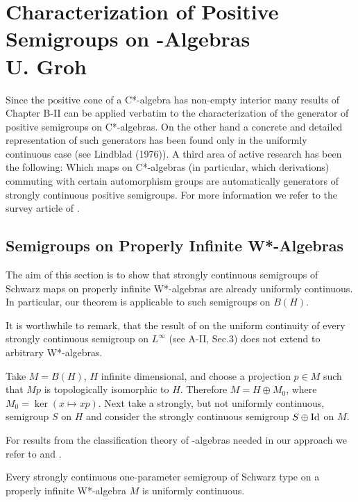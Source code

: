 

\chapter{Characterization of Positive Semigroups on \WA-Algebras \\
U. Groh}\label{chap:D-II}

Since the positive cone of a C*-algebra has non-empty interior many results of Chapter B-II can be applied verbatim to the characterization of the generator of positive semigroups on C*-algebras.
On the other hand a concrete and detailed representation of such generators has been found only in the uniformly continuous case (see Lindblad (1976)).
A third area of active research has been the following: Which maps on C*-algebras (in particular, which derivations) commuting with certain automorphism groups are automatically generators of strongly continuous positive semigroups.
For more information we refer to the survey article of \cite{evans:1984}.

\section{Semigroups on Properly Infinite W*-Algebras}

The aim of this section is to show that strongly continuous semigroups of Schwarz maps on properly infinite W*-algebras are already uniformly continuous.
In particular, our theorem is applicable to such semigroups on $B(H)$.

It is worthwhile to remark, that the result of \cite{lotz:1985} on the uniform continuity of every strongly continuous semigroup on $L^\infty$ (see A-II, Sec.3) does not extend to arbitrary W*-algebras.
\begin{example}
Take $M = B(H)$, $H$ infinite dimensional, and choose a projection $p \in M$ such that $Mp$ is topologically isomorphic to $H$.
Therefore $M = H \oplus M_{0}$, where $M_{0} = \ker(x \mapsto xp)$.
Next take a strongly, but not uniformly continuous, semigroup $S$ on $H$ and consider the strongly continuous semigroup $S \oplus \operatorname{Id}$ on $M$.
\end{example}
For results from the classification theory of \WA-algebras needed in our approach we refer to \cite[2.2]{sakai:1971} and \cite[V.1]{takesaki:1979}.

\begin{theorem}\label{thm:schwarz_uniform}
Every strongly continuous one-parameter semigroup of Schwarz type on a properly infinite W*-algebra $M$ is uniformly continuous.
\end{theorem}

